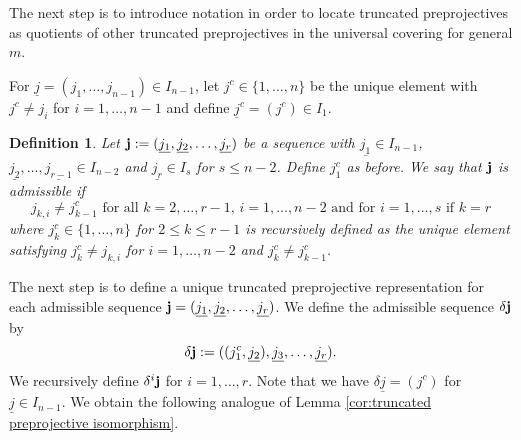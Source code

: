 \documentclass{amsart}
\newtheorem{definition}[theorem]{Definition}
\newcommand{\uj}{\underline j}
\newcommand{\ses}[3]{0\rightarrow #1\rightarrow #2\rightarrow#3\rightarrow 0}
\begin{document}
The next step is to introduce notation in order to locate truncated preprojectives as quotients of other truncated preprojectives in the universal covering for general $m$.

For $\uj=(j_1,\ldots,j_{n-1})\in I_{n-1}$, let $j^c\in \{1,\ldots,n\}$ be the unique element with $j^c\neq j_i$ for $i=1,\ldots,n-1$ and define $\uj^c=(j^c)\in I_1$.



\begin{definition}Let ${\bf j}:=(\underline{j_1},\underline{j_2},\ldots,\underline{j_r})$ be a sequence with $\underline{j_1}\in I_{n-1}$, $\underline{j_2},\ldots,\underline{j_{r-1}}\in I_{n-2}$ and $\underline{j_r}\in I_s$ for $s\leq n-2$. Define $j_1^c$ as before.
 We say that ${\bf j}$ is admissible if 
$$ j_{k,i}\neq j_{k-1}^{c}\text{ for all }k=2,\ldots, r-1,\,i=1,\ldots,n-2\text{ and for }i=1,\ldots,s\text{ if }k=r$$
where $j_{k}^c\in\{1,\ldots,n\}$ for $2\leq k\leq r-1$ is recursively defined as the unique element satisfying $j_k^c\neq j_{k,i}$ for $i=1,\ldots,n-2$ and $j_k^c\neq j_{k-1}^c$. 
\end{definition}


The next step is to define a unique truncated preprojective representation for each admissible sequence ${\bf j}=(\underline{j_1},\underline{j_2},\ldots,\underline{j_r})$. We define the admissible sequence $\delta {\bf j}$ by
\[\delta {\bf j}:=((j_1^c,\underline{j_2}),\underline{j_3},\ldots,\underline{j_r}).\]
We recursively define $\delta^i{\bf j}$ for $i=1,\dots,r$.
Note that we have $\delta\uj=(j^c)$ for $\uj\in I_{n-1}$. We obtain the following analogue of Lemma \ref{cor:truncated preprojective isomorphism}.
\end{document}
